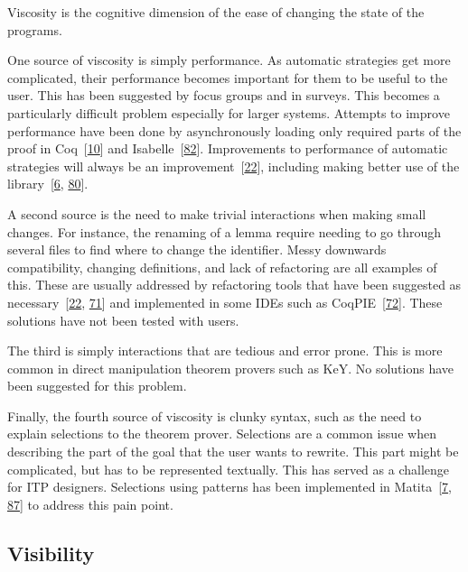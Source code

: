 \documentclass[
]{article}
\begin{document}
Viscosity is the cognitive dimension of the ease of changing the state
of the programs.

One source of viscosity is simply performance. As automatic strategies
get more complicated, their performance becomes important for them to be
useful to the user. This has been suggested by focus groups and in
surveys. This becomes a particularly difficult problem especially for
larger systems. Attempts to improve performance have been done by
asynchronously loading only required parts of the proof in
Coq~{[}\protect\hyperlink{ref-barras_asynchronous_2015}{10}{]} and
Isabelle~{[}\protect\hyperlink{ref-wenzel_asynchronous_2014}{82}{]}.
Improvements to performance of automatic strategies will always be an
improvement~{[}\protect\hyperlink{ref-bourke_challenges_2012}{22}{]},
including making better use of the
library~{[}\protect\hyperlink{ref-asperti_considerations_2010}{6},
\protect\hyperlink{ref-tassi_interactive_2008}{80}{]}.

A second source is the need to make trivial interactions when making
small changes. For instance, the renaming of a lemma require needing to
go through several files to find where to change the identifier. Messy
downwards compatibility, changing definitions, and lack of refactoring
are all examples of this. These are usually addressed by refactoring
tools that have been suggested as
necessary~{[}\protect\hyperlink{ref-bourke_challenges_2012}{22},
\protect\hyperlink{ref-ringer_replica_2020}{71}{]} and implemented in
some IDEs such as
CoqPIE~{[}\protect\hyperlink{ref-roe_coqpie_2016}{72}{]}. These
solutions have not been tested with users.

The third is simply interactions that are tedious and error prone. This
is more common in direct manipulation theorem provers such as KeY. No
solutions have been suggested for this problem.

Finally, the fourth source of viscosity is clunky syntax, such as the
need to explain selections to the theorem prover. Selections are a
common issue when describing the part of the goal that the user wants to
rewrite. This part might be complicated, but has to be represented
textually. This has served as a challenge for ITP designers. Selections
using patterns has been implemented in
Matita~{[}\protect\hyperlink{ref-asperti_user_2007}{7},
\protect\hyperlink{ref-zacchiroli_user_2007}{87}{]} to address this pain
point.

\hypertarget{visibility}{%
\subsection{Visibility}\label{visibility}}
\end{document}
